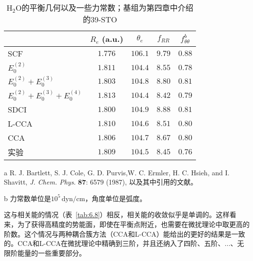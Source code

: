 \begin{table}
	\centering
	\caption{$\mathrm{H_2O}$的平衡几何以及一些力常数；基组为第四章中介绍的39-STO}
	\begin{threeparttable}
		\begin{tabular}{lcccc}
			\hline & $R_e$ (a.u.) & $\theta_e$ & $f_{R R}$\tnote{b} & $f_{\theta \theta}^b$ \\
			\hline SCF & $1.776$ & $106.1$ & $9.79$ & $0.88$ \\
			$E_0^{(2)}$ & $1.811$ & $104.4$ & $8.55$ & $0.78$ \\
			$E_0^{(2)}+E_0^{(3)}$ & $1.803$ & $104.8$ & $8.80$ & $0.81$ \\
			$E_0^{(2)}+E_0^{(3)}+E_0^{(4)}$ & $1.813$ & $104.4$ & $8.42$ & $0.79$ \\
			SDCI & $1.800$ & $104.9$ & $8.88$ & $0.81$ \\
			L-CCA & $1.810$ & $104.6$ & $8.51$ & $0.80$ \\
			CCA & $1.806$ & $104.7$ & $8.67$ & $0.80$ \\
			实验 & $1.809$ & $104.5$ & $8.45$ & $0.76$ \\
			\hline
		\end{tabular}
		\begin{tablenotes}
			\item[a] R. J. Bartlett, S. J. Cole, G. D. Purvis,W. C. Ermler, H. C. Hsieh, and I. Shavitt, \textit{J. Chem. Phys.} \textbf{87}: 6579 (1987), 以及其中引用的文献。
			\item[b] 力常数单位是$10^5\,\mathrm{dyn/cm}$，角度单位是弧度。
		\end{tablenotes}
	\end{threeparttable}
\label{tab:6.9}
\end{table}

这与相关能的情况（表~\ref{tab:6.8}）相反，相关能的收敛似乎是单调的。这样看来，为了获得高精度的势能面，即使在平衡点附近，也需要在微扰理论中取更高的阶数。这个情况与两种耦合簇方法（CCA和L-CCA）能给出的更好的结果是一致的。CCA和L-CCA在微扰理论中精确到三阶，并且还纳入了四阶、五阶、...、无限阶能量的一些重要部分。

